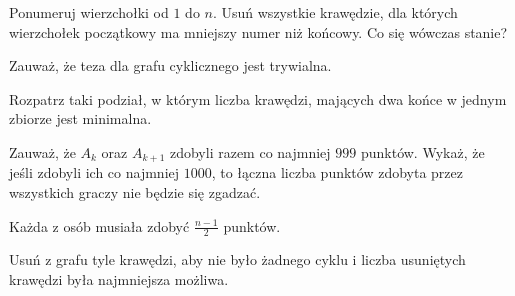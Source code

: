 
\begin{hints_list}
	\item Ponumeruj wierzchołki od $1$ do $n$. Usuń wszystkie krawędzie, dla których wierzchołek początkowy ma mniejszy numer niż końcowy. Co się wówczas stanie?
	\item Zauważ, że teza dla grafu cyklicznego jest trywialna.
	\item Rozpatrz taki podział, w którym liczba krawędzi, mających dwa końce w jednym zbiorze jest minimalna.
	\item Zauważ, że $A_k$ oraz $A_{k + 1}$ zdobyli razem co najmniej $999$ punktów. Wykaż, że jeśli zdobyli ich co najmniej $1000$, to łączna liczba punktów zdobyta przez wszystkich graczy nie będzie się zgadzać.
	\item Każda z osób musiała zdobyć $\frac{n - 1}{2}$ punktów.
	\item Usuń z grafu tyle krawędzi, aby nie było żadnego cyklu i liczba usuniętych krawędzi była najmniejsza możliwa.
\end{hints_list}